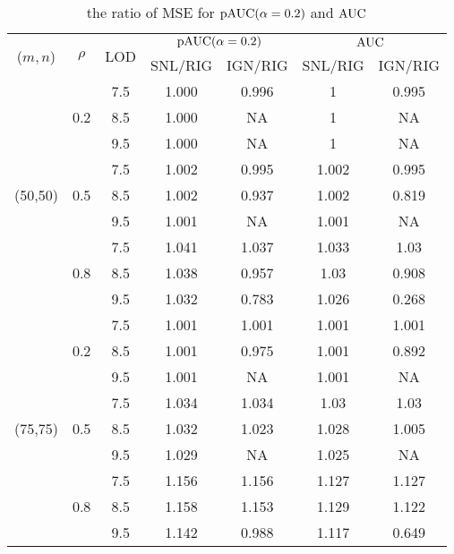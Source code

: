 \documentclass[a4,11pt,epsf, amssymb]{article}
\begin{document}
\begin{table}[htbp]
  \centering
  \caption{the ratio of MSE for $\hbox {pAUC}(\alpha = 0.2)$ and $\hbox {AUC}$}
    \begin{tabular}{c|cccccc}
    \hline
    \multirow{2}[2]{*}{($m,n$)} & \multirow{2}[2]{*}{$\rho$} & \multirow{2}[2]{*}{LOD} & \multicolumn{2}{c}{$\hbox {pAUC}(\alpha = 0.2)$} & \multicolumn{2}{c}{$\hbox {AUC}$} \\
          &       &       & SNL/RIG & IGN/RIG & SNL/RIG & IGN/RIG \\
    \hline
    \multirow{9}[4]{*}{(50,50)} & \multirow{3}[2]{*}{0.2} & 7.5   & 1.000  & 0.996 & 1     & 0.995\\
          &       & 8.5   & 1.000  & NA    & 1     & NA \\
          &       & 9.5   & 1.000  & NA    & 1     & NA \\
\cline{2-7}          & \multirow{3}[1]{*}{0.5} & 7.5   & 1.002  & 0.995 & 1.002 & 0.995\\
          &       & 8.5   & 1.002  & 0.937 & 1.002 & 0.819 \\
          &       & 9.5   & 1.001  & NA    & 1.001 & NA \\
          & \multirow{3}[1]{*}{0.8} & 7.5   & 1.041  & 1.037 & 1.033 & 1.03 \\
          &       & 8.5   & 1.038  & 0.957 & 1.03  & 0.908 \\
          &       & 9.5   & 1.032  & 0.783 & 1.026 & 0.268 \\
    \hline
    \multirow{9}[6]{*}{(75,75)} & \multirow{3}[2]{*}{0.2} & 7.5   & 1.001  & 1.001  & 1.001 & 1.001\\
          &       & 8.5   & 1.001  & 0.975  & 1.001 & 0.892 \\
          &       & 9.5   & 1.001  & NA    & 1.001 & NA\\
\cline{2-7}          & \multirow{3}[2]{*}{0.5} & 7.5   & 1.034  & 1.034 & 1.03  & 1.03\\
          &       & 8.5   & 1.032  & 1.023 & 1.028 & 1.005 \\
          &       & 9.5   & 1.029  & NA    & 1.025 & NA \\
\cline{2-7}          & \multirow{3}[2]{*}{0.8} & 7.5   & 1.156  & 1.156 & 1.127 & 1.127\\
          &       & 8.5   & 1.158  & 1.153 & 1.129 & 1.122 \\
          &       & 9.5   & 1.142  & 0.988 & 1.117 & 0.649 \\

\end{tabular}
\end{table}
\end{document}
